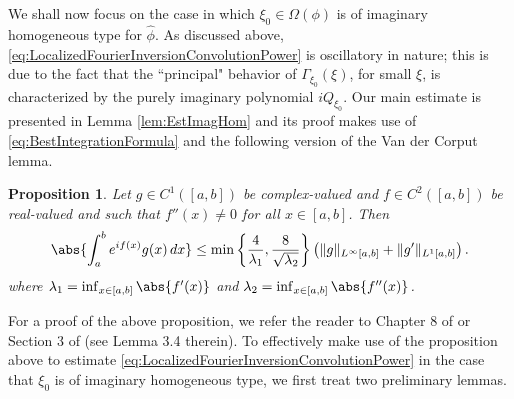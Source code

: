 \documentclass[11pt, letter]{book}
\newtheorem{proposition}[theorem]{Proposition}
\begin{document}
\noindent We shall now focus on the case in which $\xi_0\in\Omega(\phi)$ is of imaginary homogeneous type for $\widehat{\phi}$. As discussed above,  \eqref{eq:LocalizedFourierInversionConvolutionPower} is oscillatory in nature; this is due to the fact that the ``principal" behavior of $\Gamma_{\xi_0}(\xi)$, for small $\xi$, is characterized by the purely imaginary polynomial $iQ_{\xi_0}$. Our main estimate is presented in Lemma \ref{lem:EstImagHom} and its proof makes use of \eqref{eq:BestIntegrationFormula} and the following version of the Van der Corput lemma.


\begin{framed}
\begin{proposition}\label{prop:VanderCorput}
Let $g\in C^1([a,b])$ be complex-valued and $f\in C^2([a,b])$ be real-valued and such that $f''(x)\neq 0$ for all $x\in [a,b]$. Then
\begin{equation*}
\abs{\int_a^b e^{if(x)}g(x)\,dx}\leq \min\left\{\frac{4}{\lambda_1},\frac{8}{\sqrt{\lambda_2}}\right\}\left(\|g\|_{L^\infty[a,b]}+\|g'\|_{L^1[a,b]}\right).
\end{equation*}
where $\lambda_1=\inf_{x\in[a,b]}\abs{f'(x)}$ and $\lambda_2=\inf_{x\in [a,b]}\abs{f''(x)}$.
\end{proposition}
\end{framed}


\noindent For a proof of the above proposition, we refer the reader to Chapter 8 of \cite{stein_harmonic_1993} or Section 3 of \cite{randles_convolution_2015} (see Lemma 3.4 therein).  To effectively make use of the proposition above to estimate \eqref{eq:LocalizedFourierInversionConvolutionPower} in the case that $\xi_0$ is of imaginary homogeneous type, we first treat two preliminary lemmas. 
\end{document}
